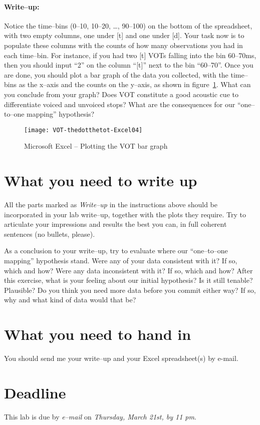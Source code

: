 \documentclass{article}
\newcommand{\soft}[1]{\textsf{#1}}
\newcommand{\MSExcel}{\soft{Microsoft\texttrademark{} Excel}}
\begin{document}
\paragraph{Write--up:} Notice the time--bins (0--10, 10--20, \dots{}, 90--100) on the bottom of the spreadsheet, with two empty columns, one under [t] and one under [d]. Your task now is to populate these columns with the counts of how many observations you had in each time--bin. For instance, if you had two [t] VOTs falling into the bin 60--70ms, then you should input ``2'' on the column ``[t]'' next to the bin ``60--70''. Once you are done, you should plot a bar graph of the data you collected, with the time--bins as the x--axis and the counts on the y--axis, as shown in figure~\ref{step7VOT}. What can you conclude from your graph? Does VOT constitute a good acoustic cue to differentiate voiced and unvoiced stops? What are the consequences for our ``one--to--one mapping'' hypothesis?

\begin{figure}[!tbp]
\caption{\MSExcel{} -- Plotting the VOT bar graph}
\label{step7VOT}
	\begin{center}
		\texttt{[image: VOT-thedotthetot-Excel04]}
	\end{center}
\end{figure}
 
\section{What you need to write up}

All the parts marked as \emph{Write--up} in the instructions above should be incorporated in your lab write--up, together with the plots they require. Try to articulate your impressions and results the best you can, in full coherent sentences (no bullets, please).

As a conclusion to your write--up, try to evaluate where our ``one--to--one mapping'' hypothesis stand. Were any of your data consistent with it? If so, which and how? Were any data inconsistent with it? If so, which and how? After this exercise, what is your feeling about our initial hypothesis? Is it still tenable? Plausible? Do you think you need more data before you commit either way? If so, why and what kind of data would that be?

\section{What you need to hand in}

You should send me your write--up and your Excel spreadsheet(s) by e-mail.

\section{Deadline}

This lab is due by \emph{e--mail} on \emph{Thursday, March 21st, by 11 pm}.
\end{document}
